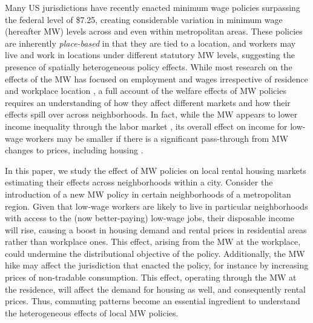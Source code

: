 

Many US jurisdictions have recently enacted minimum wage policies surpassing the 
federal level of \$7.25, creating considerable variation in minimum wage 
(hereafter MW) levels across and even within metropolitan areas.
These policies are inherently \textit{place-based} in that they are tied to 
a location, and workers may live and work in locations under different 
statutory MW levels, suggesting the presence of spatially heterogeneous policy 
effects.
While most research on the effects of the MW has focused on employment and 
wages irrespective of residence and workplace location
\parencite[e.g.,][]{CardKrueger1994, CegnizEtAl2019},
a full account of the welfare effects of MW policies requires an understanding 
of how they affect different markets and how their effects spill over across 
neighborhoods.
In fact, while the MW appears to lower income inequality through the labor 
market \parencite{Lee1999, AutorEtAl2016},
its overall effect on income for low-wage workers may be smaller if there is 
a significant pass-through from MW changes to prices, including housing
\parencite{Macurdy2015}.

In this paper, we study the effect of MW policies on local rental housing 
markets estimating their effects across neighborhoods within a city.
Consider the introduction of a new MW policy in certain neighborhoods of a 
metropolitan region.
Given that low-wage workers are likely to live in particular neighborhoods with 
access to the (now better-paying) low-wage jobs,
their disposable income will rise, causing a boost in housing demand and rental 
prices in residential areas rather than workplace ones.
This effect, arising from the MW at the workplace, could undermine the 
distributional objective of the policy.
Additionally, the MW hike may affect the jurisdiction that enacted the policy, 
for instance by increasing prices of non-tradable consumption.
This effect, operating through the MW at the residence, will affect the 
demand for housing as well, and consequently rental prices.
Thus, commuting patterns become an essential ingredient to understand the 
heterogeneous effects of local MW policies.

